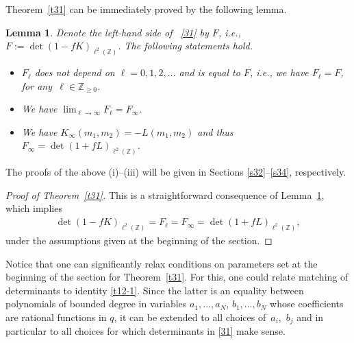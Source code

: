 \documentclass[11pt]{article}
\numberwithin{equation}{section}
\numberwithin{equation}{section}
\newtheorem{Lemma}[Theorem]{Lemma}
\def\i{\infty}
\def\Z{\mathbb{Z}}
\begin{document}
Theorem~\ref{t31} can be immediately proved by the following lemma.

\begin{Lemma}\label{l32}
Denote the left-hand side of ~\eqref{31} by $F$, i.e., $F:=\det\left(1-f K\right)_{\ell^2(\Z)}$. The following statements hold.
\begin{itemize}\itemsep=0pt
\item[{\rm (i)}]
$F_\ell$ does not depend on $\ell=0,1,2,\dots$ and is equal to $F$, i.e., we have $F_{\ell}=F$, for any~${\ell\in\Z_{\ge 0}}$.
\item[{\rm (ii)}] We have $\lim_{\ell \rightarrow\i} F_{\ell}=F_{\i}$.
\item[{\rm (iii)}] We have $K_{\i}(m_1,m_2)=-L(m_1,m_2)$
and thus $F_{\i}=\det(1+f L)_{\ell^2(\Z)}$.
\end{itemize}
\end{Lemma}
The proofs of the above (i)--(iii) will
be given in Sections \ref{s32}--\ref{s34}, respectively.

\begin{proof}[Proof of Theorem~\ref{t31}]
 This is a straightforward consequence of Lemma~\ref{l32}, which implies
 \begin{align*}
 \det(1-fK)_{\ell^2(\Z)}
 =
 F_{\ell}
 =
 F_{\i}
 =
 \det(1+fL)_{\ell^2(\Z)},
 \end{align*}
 under the assumptions given at the beginning of the section.
 \end{proof}

 Notice that one can significantly relax conditions on parameters set at the beginning of the section for Theorem~\ref{t31}. For this, one could relate matching of determinants to identity \eqref{t12-1}. Since the latter is an equality between polynomials of bounded degree in variables $a_1,\dots,a_N$, $b_1,\dots,b_N$ whose coefficients are rational functions in $q$, it can be extended to all choices of~$a_i$,~$b_j$ and in particular to all choices for which determinants in \eqref{31} make sense.
\end{document}
